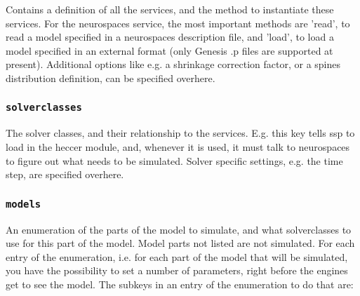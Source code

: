 \documentclass[12pt]{article}
\begin{document}
    Contains a definition of all the services, and the method to instantiate these services. For the neurospaces service, the most important methods are 'read', to read a model specified in a neurospaces description file, and 'load', to load a model specified in an external format (only Genesis .p files are supported at present). Additional options like e.g. a shrinkage correction factor, or a spines distribution definition, can be specified overhere. 

\subsubsection*{\tt solverclasses}

    The solver classes, and their relationship to the services. E.g. this key tells ssp to load in the heccer module, and, whenever it is used, it must talk to neurospaces to figure out what needs to be simulated. Solver specific settings, e.g. the time step, are specified overhere. 

\subsubsection*{\tt models}

    An enumeration of the parts of the model to simulate, and what solverclasses to use for this part of the model. Model parts not listed are not simulated. For each entry of the enumeration, i.e. for each part of the model that will be simulated, you have the possibility to set a number of parameters, right before the engines get to see the model. The subkeys in an entry of the enumeration to do that are: 
\end{document}

